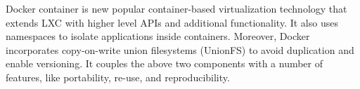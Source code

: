 Docker container is new popular container-based virtualization technology that extends LXC with higher level APIs and additional functionality. It also uses namespaces to isolate applications inside containers. Moreover, Docker incorporates copy-on-write union filesystems (UnionFS) to avoid duplication and enable versioning. It couples the above two components with a number of features, like portability, re-use, and reproducibility.



 
 
 

